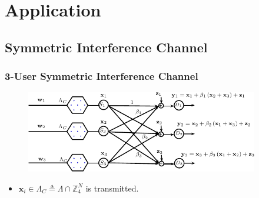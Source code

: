 \documentclass[10pt]{beamer}
\newcommand{\defeq}{\triangleq}
\begin{document}
\section{Application}
\subsection{Symmetric Interference Channel}
\begin{frame}\frametitle{3-User Symmetric Interference Channel}
	\begin{figure}
	\centering
    \includegraphics[width=4in]{IC_model_ISIT_3user}
	\end{figure}
\pause
\begin{itemize}
\item $\mathbf{x}_{i}\in \Lambda_{C}\defeq \Lambda \cap \mathbb{Z}_{4}^{N}$ is transmitted.
\vspace{0.2in}
\end{itemize}
\end{frame}
\end{document}
